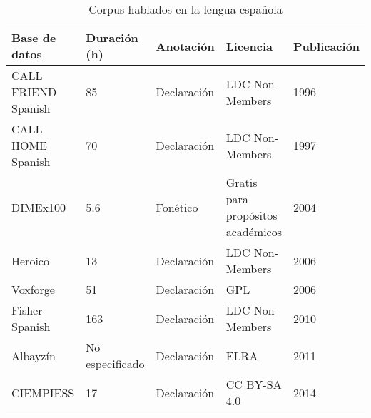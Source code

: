 \begin{table}[H]
\centering
\caption{Corpus hablados en la lengua española}
\label{tab:spanish_corpora}
\begin{tabular}{|l|l|l|l|l|}
\hline
\textbf{Base de datos} & \textbf{Duración (h)}  & \textbf{Anotación} &  \textbf{Licencia} & \textbf{Publicación}\\

\hline
CALL FRIEND Spanish & 85  & Declaración & LDC Non-Members & 1996\\
\hline
CALL HOME Spanish & 70  & Declaración & LDC Non-Members  & 1997\\
\hline
DIMEx100 & 5.6  & Fonético & \multicolumn{1}{|p{4cm}|}{Gratis para propósitos académicos}  & 2004 \\
\hline
Heroico & 13 & Declaración & LDC Non-Members  & 2006 \\
\hline
Voxforge & 51 & Declaración & GPL & 2006\\
\hline
Fisher Spanish & 163  & Declaración  & LDC Non-Members & 2010\\
\hline
Albayzín & No especificado  & Declaración & ELRA & 2011\\
\hline
CIEMPIESS & 17  & Declaración & CC BY-SA 4.0 & 2014\\
\hline
\end{tabular}
\end{table}